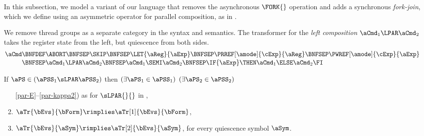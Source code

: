 In this subsection, we model a variant of our language that removes the
asynchronous $\FORK{}$ operation and adds a synchronous \emph{fork-join},
which we define using an asymmetric operator for parallel composition, as in
\cite{DBLP:conf/icfp/FerreiraHJ96}.

We remove thread groups as a separate category in the syntax and semantics.
The transformer for the \emph{left composition} $\aCmd_1\LPAR\aCmd_2$ takes
the register state from the left, but quiescence from both sides.
\begin{align*}
  \aCmd
  \BNFDEF& \ABORT
  \BNFSEP \SKIP
  \BNFSEP \LET{\aReg}{\aExp}
  \BNFSEP \PRREF[\amode]{\cExp}{\aReg}
  \BNFSEP \PWREF[\amode]{\cExp}{\aExp}
  \\[-.5ex]
  \BNFSEP& \aCmd_1 \LPAR \aCmd_2
  \BNFSEP \aCmd_1 \SEMI \aCmd_2
  \BNFSEP \IF{\aExp} \THEN \aCmd_1 \ELSE \aCmd_2 \FI  
\end{align*}

\begin{definition}
  If $\aPS \in (\aPSS_1\sLPAR\aPSS_2)$ then
  $(\exists\aPS_1\in\aPSS_1)$ $(\exists\aPS_2\in\aPSS_2)$
  \begin{enumerate}
  \item[\ref{par-E}--\ref{par-kappa2})]
    as for $\sLPAR{}{}$ in ,
  \item \label{par-tau1}
    $\aTr{\bEvs}{\bForm} \rimplies \aTr[1]{\bEvs}{\bForm}$,
  \item \label{par-tau2}
    $\aTr{\bEvs}{\aSym} \rimplies \aTr[2]{\bEvs}{\aSym}$,
    for every quiescence symbol $\aSym$.
  \end{enumerate}
\end{definition}

